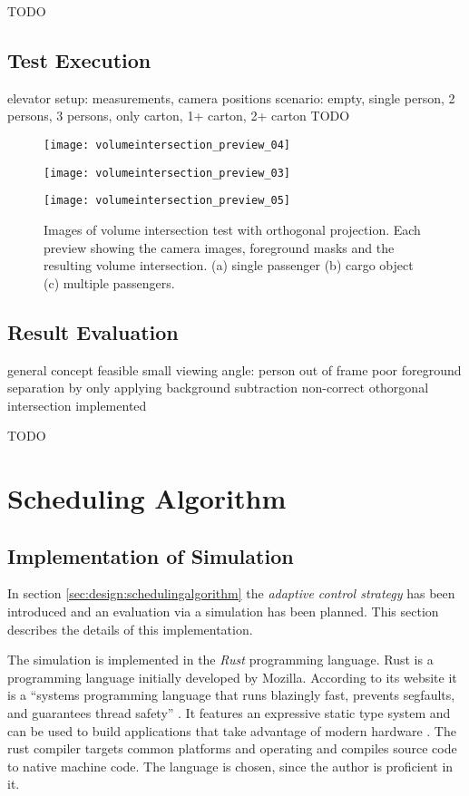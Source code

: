 TODO
\subsection{Test Execution}
elevator setup: measurements, camera positions
scenario: empty, single person, 2 persons, 3 persons, only carton, 1+ carton, 2+ carton
TODO

\begin{figure}[p]
    \centering
    \texttt{[image: volumeintersection\_preview\_04]}
    
    \vspace{0.5em}
    
    \texttt{[image: volumeintersection\_preview\_03]}
    
    \vspace{0.5em}
    
    \texttt{[image: volumeintersection\_preview\_05]}
    
    \caption[Images of volume intersection test with orthogonal projection]{Images of volume intersection test with orthogonal projection. Each preview showing the camera images, foreground masks and the resulting volume intersection. (a) single passenger (b) cargo object (c) multiple passengers.}
    \label{fig:impl:preview}
\end{figure}

\subsection{Result Evaluation}
general concept feasible
small viewing angle: person out of frame
poor foreground separation by only applying background subtraction
non-correct othorgonal intersection implemented

TODO

\section{Scheduling Algorithm}
\subsection{Implementation of Simulation}
In section \ref{sec:design:schedulingalgorithm} the \emph{adaptive control strategy} has been introduced and an evaluation via a simulation has been planned.
This section describes the details of this implementation.

The simulation is implemented in the \emph{Rust} programming language.
Rust is a programming language initially developed by Mozilla.
According to its website it is a \enquote{systems programming language that runs blazingly fast, prevents segfaults, and guarantees thread safety} \autocite{rust2018rust}.
It features an expressive static type system and can be used to build applications that take advantage of modern hardware
\autocite[][]{matsakis2014rust}.
The rust compiler targets common platforms and operating and compiles source code to native machine code.
The language is chosen, since the author is proficient in it.

